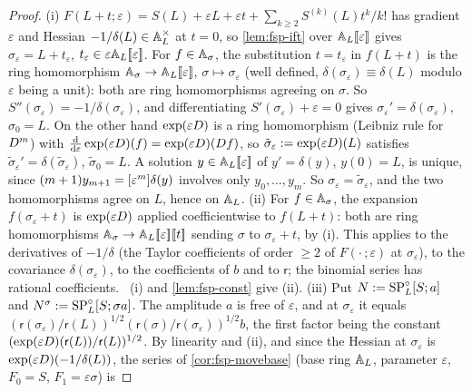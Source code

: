 \begin{proof}
(i) $F(L+t;\varepsilon)=S(L)+\varepsilon L+\varepsilon t+\sum_{k\geq2}S^{(k)}(L)t^k/k!$ has gradient $\varepsilon$ and Hessian $-1/\delta(L)\in\mathbb{A}_{L}^\times$ at $t=0$, so \cref{lem:fsp-ift} over $\mathbb{A}_{L}[\![ \varepsilon ]\!]$ gives $\sigma_\varepsilon=L+t_\varepsilon$, $t_\varepsilon\in\varepsilon\mathbb{A}_{L}[\![ \varepsilon ]\!]$. For $f\in\mathbb{A}_\sigma$, the substitution $t=t_\varepsilon$ in $f(L+t)$ is the ring homomorphism $\mathbb{A}_\sigma\to\mathbb{A}_{L}[\![ \varepsilon ]\!]$, $\sigma\mapsto\sigma_\varepsilon$ (well defined, $\delta(\sigma_\varepsilon)\equiv\delta(L)$ modulo $\varepsilon$ being a unit): both are ring homomorphisms agreeing on $\sigma$. So $S''(\sigma_\varepsilon)=-1/\delta(\sigma_\varepsilon)$, and differentiating $S'(\sigma_\varepsilon)+\varepsilon=0$ gives $\sigma_\varepsilon'=\delta(\sigma_\varepsilon)$, $\sigma_0=L$. On the other hand $\exp(\varepsilon D)$ is a ring homomorphism (Leibniz rule for $D^m$) with $\frac{\mathrm{d}}{\mathrm{d}\varepsilon}\exp(\varepsilon D)(f)=\exp(\varepsilon D)(D f)$, so $\tilde\sigma_\varepsilon:=\exp(\varepsilon D)(L)$ satisfies $\tilde\sigma_\varepsilon'=\delta(\tilde\sigma_\varepsilon)$, $\tilde\sigma_0=L$. A solution $y\in\mathbb{A}_{L}[\![ \varepsilon ]\!]$ of $y'=\delta(y)$, $y(0)=L$, is unique, since $(m+1)y_{m+1}=[\varepsilon^m]\delta(y)$ involves only $y_0,\dots,y_m$. So $\sigma_\varepsilon=\tilde\sigma_\varepsilon$, and the two homomorphisms agree on $L$, hence on $\mathbb{A}_{L}$.
(ii) For $f\in\mathbb{A}_\sigma$, the expansion $f(\sigma_\varepsilon+t)$ is $\exp(\varepsilon D)$ applied coefficientwise to $f(L+t)$: both are ring homomorphisms $\mathbb{A}_\sigma\to\mathbb{A}_{L}[\![ \varepsilon ]\!][\![ t ]\!]$ sending $\sigma$ to $\sigma_\varepsilon+t$, by (i). This applies to the derivatives of $-1/\delta$ (the Taylor coefficients of order $\geq2$ of $F(\cdot\,;\varepsilon)$ at $\sigma_\varepsilon$), to the covariance $\delta(\sigma_\varepsilon)$, to the coefficients of $b$ and to $\mathsf r$; the binomial series has rational coefficients. ~(i) and \cref{lem:fsp-const} give (ii).
(iii) Put $N:=\mathrm{SP}^{\circ}_L[S;a]$ and $N^\sigma:=\mathrm{SP}^{\circ}_L[S;\sigma a]$. The amplitude $a$ is free of $\varepsilon$, and at $\sigma_\varepsilon$ it equals $(\mathsf r(\sigma_\varepsilon)/\mathsf r(L))^{1/2}(\mathsf r(\sigma)/\mathsf r(\sigma_\varepsilon))^{1/2}b$, the first factor being the constant $(\exp(\varepsilon D)(\mathsf r(L))/\mathsf r(L))^{1/2}$. By linearity and (ii), and since the Hessian at $\sigma_\varepsilon$ is $\exp(\varepsilon D)(-1/\delta(L))$, the series of \cref{cor:fsp-movebase} (base ring $\mathbb{A}_{L}$, parameter $\varepsilon$, $F_0=S$, $F_1=\varepsilon\sigma$) is

\end{proof}
